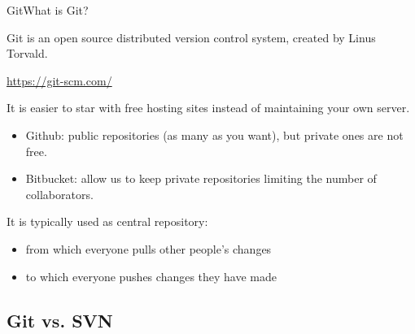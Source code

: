\documentclass{beamer}
\begin{document}
\begin{frame}{Git}{What is Git?}

Git is an open source distributed version control system, created by Linus Torvald.

\url{https://git-scm.com/}

It is easier to star with free hosting sites instead of maintaining your own server.

\begin{itemize}
 \item Github: public repositories (as many as you want), but private ones are not free.
 \item Bitbucket: allow us to keep private repositories limiting the number of collaborators.
\end{itemize}

It is typically used as central repository:
\begin{itemize}
 \item from which everyone pulls other people’s changes
 \item to which everyone pushes changes they have made
\end{itemize}

\end{frame}

\subsection{Git vs. SVN}
\end{document}
